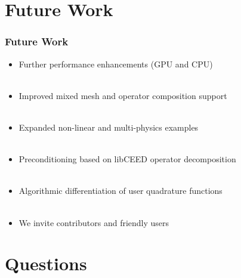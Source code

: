 \documentclass{beamer}
\begin{document}
\section{Future Work}

\begin{frame}
\begin{center}
\frametitle{Future Work}

\begin{itemize}

\item Further performance enhancements (GPU and CPU)\\

~\\

\item Improved mixed mesh and operator composition support\\

~\\

\item Expanded non-linear and multi-physics examples\\

~\\

\item Preconditioning based on libCEED operator decomposition\\

~\\

\item Algorithmic differentiation of user quadrature functions\\

~\\

\item We invite contributors and friendly users

\end{itemize}

\end{center}
\end{frame}

\section{Questions}
\end{document}
